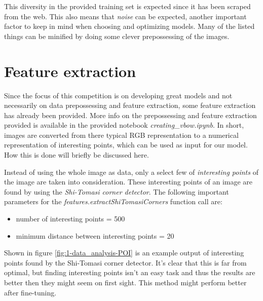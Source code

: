 This diversity in the provided training set is expected since it has been scraped from the web.
This also means that \emph{noise} can be expected, another important factor to keep in mind when choosing and optimizing models.
Many of the listed things can be minified by doing some clever prepossessing of the images.



\section{Feature extraction}
\label{section:DA_feature_extraction}

Since the focus of this competition is on developing great models and not necessarily on data prepossessing and feature extraction, some feature extraction has already been provided.
More info on the prepossessing and feature extraction provided is available in the provided notebook \emph{creating\_vbow.ipynb}.
In short, images are converted from there typical RGB representation to a numerical representation of interesting points, which can be used as input for our model.
How this is done will briefly be discussed here.

Instead of using the whole image as data, only a select few of \emph{interesting points} of the image are taken into consideration.
These interesting points of an image are found by using the \emph{Shi-Tomasi corner detector}.
The following important parameters for the \emph{features.extractShiTomasiCorners} function call are:
\begin{itemize}
    \item number of interesting points = 500
    \item minimum distance between interesting points = 20
\end{itemize}

Shown in figure \ref{fig:1-data_analysis-POI} is an example output of interesting points found by the Shi-Tomasi corner detector.
It's clear that this is far from optimal, but finding interesting points isn't an easy task and thus the results are better then they might seem on first sight.
This method might perform better after fine-tuning.

